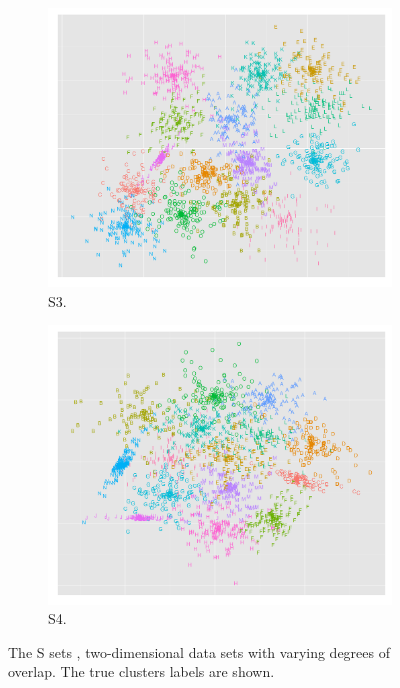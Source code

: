 \begin{figure}[H]
\begin{subfigure}{.4\textwidth}
  \centering
  \includegraphics[width=.9\linewidth]{s_set/s_set_3_truth.png}
  \caption{S3.}
\end{subfigure}%
\begin{subfigure}{.4\textwidth}
  \centering
  \includegraphics[width=.9\linewidth]{s_set/s_set_4_truth.png}
  \caption{S4.}
\end{subfigure}
\caption{The S sets \citep{Franti2006}, two-dimensional data sets with varying degrees of overlap. The true clusters labels are shown. }
\label{fig:s_set_truth}
\end{figure}



